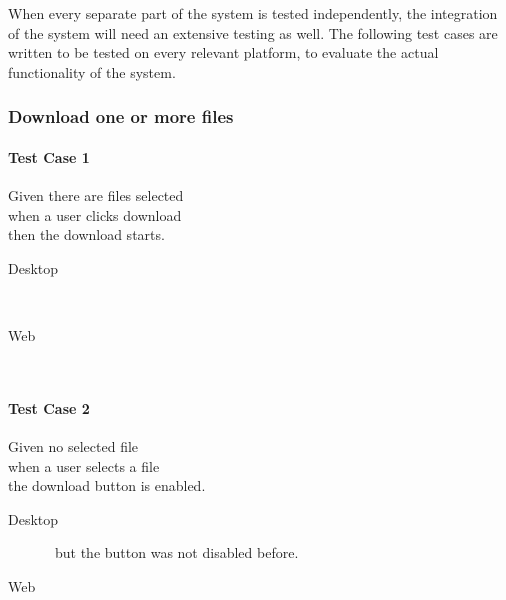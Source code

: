 
%

When every separate part of the system is tested independently, the integration of the system will need an extensive testing as well. The following test cases are written to be tested on every relevant platform, to evaluate the actual functionality of the system.


\subsubsection{Download one or more files}
\paragraph*{Test Case 1}
Given there are files selected \\ when a user clicks download \\ then the download starts.
\begin{description}
 \item[Desktop] \cmark\
 \item[Web] \cmark\
\end{description}
\paragraph*{Test Case 2}
Given no selected file \\ when a user selects a file \\ the download button is enabled.
\begin{description}
 \item[Desktop] \cmark\ but the button was not disabled before.
 \item[Web] \cmark\
\end{description}
